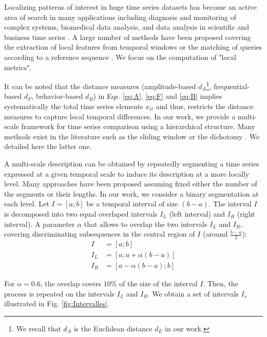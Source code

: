 Localizing patterns of interest in huge time series datasets has become an active area of search in many applications including diagnosis and monitoring of complex systems, biomedical data analysis, and data analysis in scientific and business time series . A large number of methods have been proposed covering the extraction of local features from temporal windows \cite{Berndt1994a} or the matching of queries according to a reference sequence \cite{Faloutsos1994}. We focus on the computation of "local metrics".

It can be noted that the distance measures (amplitude-based $d_A$\footnote{We recall that $d_A$ is the Euclidean distance $d_E$ in our work.}, frequential-based $d_F$, behavior-based $d_B$) in Eqs. \ref{eq:A}, \ref{eq:F} and \ref{eq:B} implies systematically the total time series elements $x_{it}$ and thus, restricts the distance measures to capture local temporal differences. In our work, we provide a multi-scale framework for time series comparison using a hierarchical structure. Many methods exist in the literature such as the sliding window or the dichotomy . We detailed here the latter one.


A multi-scale description can be obtained by repeatedly segmenting a time series expressed at a given temporal scale to induce its description at a more locally level. Many approaches have been proposed assuming fixed either the number of the segments or their lengths. In our work, we consider a binary segmentation at each level. Let $I=[a;b]$ be a temporal interval of size $(b-a)$. The interval $I$ is decomposed into two equal overlaped intervals $I_L$ (left interval) and $I_R$ (right interval). A parameter $\alpha$ that allows to overlap the two intervals $I_L$ and $I_R$, covering discriminating subsequences in the central region of $I$ (around $\frac{b-a}{2}$):
\begin{align}
	I &= [a;b] \\
	I_L &= [a;a+\alpha(b-a)] \\
	I_R &= [a-\alpha(b-a);b] 
	\label{key}
\end{align}

\noindent For $\alpha = 0.6$, the overlap covers $10\%$ of the size of the interval $I$. Then, the process is repeated on the intervals $I_L$ and $I_R$. We obtain a set of intervals $I_s$ illustrated in Fig. \ref{fig:Intervalles}.

